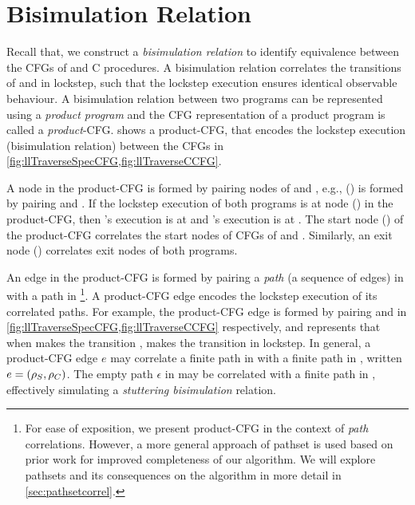 \section{Bisimulation Relation}
\label{sec:bisim}
Recall that,
we construct a {\em bisimulation relation} to identify equivalence between the CFGs of \SpecL{} and C procedures.
A bisimulation relation correlates the transitions of \sprog{} and \cprog{} in lockstep, such that the
lockstep execution ensures identical observable behaviour.
A bisimulation relation between two programs can be represented using a {\em product program}
\cite{covac} and the CFG representation of a product program is called a {\em product}-CFG.
 shows a product-CFG, that encodes the lockstep execution
(bisimulation relation) between the CFGs in \cref{fig:llTraverseSpecCFG,fig:llTraverseCCFG}.

A node in the product-CFG is formed by pairing nodes of \sprog{} and \cprog{},
e.g., () is formed by pairing  and .
If the lockstep execution of both programs is at node () in the product-CFG,
then \sprog{}'s execution is at  and \cprog{}'s execution is at .
The start node () of the product-CFG correlates the start nodes of CFGs of \sprog{} and \cprog{}.
Similarly, an exit node () correlates exit nodes of both programs.

An edge in the product-CFG is formed by pairing a {\em path} (a sequence of edges) in \sprog{}
with a path in \cprog{}\footnote{
For ease of exposition, we present product-CFG in the context of {\em path} correlations.
However, a more general approach of pathset is used based on prior work \cite{oopsla20}
for improved completeness of our algorithm.
We will explore pathsets and its consequences on the algorithm in more detail in \cref{sec:pathsetcorrel}.}.
A product-CFG edge encodes the lockstep execution of its correlated paths.
For example, the product-CFG edge  is formed by pairing
 and  in \cref{fig:llTraverseSpecCFG,fig:llTraverseCCFG} respectively,
and represents that when \sprog{} makes the transition , \cprog{} makes the transition 
in lockstep.
In general, a product-CFG edge $e$ may correlate a finite path \sv{\rho} in \sprog{} with a finite path
\cv{\rho} in \cprog{}, written $e=({\tt \rho}_{S},{\tt \rho}_{C})$.
The empty path $\epsilon$ in \sprog{} may be correlated with a finite path in \cprog{},
effectively simulating a {\em stuttering bisimulation} relation.

